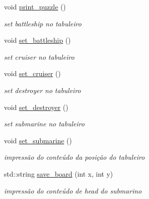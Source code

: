\begin{DoxyCompactItemize}
void \hyperlink{classpuzzle_a842cbb0148e02ce593363dabbdb0d4c5}{print\+\_\+puzzle} ()
\begin{DoxyCompactList}\small\item\em set battleship no tabuleiro \end{DoxyCompactList}\item 
\mbox{\label{classpuzzle_a793a79c16dc7d88b90df080e4b9500b2}} 
void \hyperlink{classpuzzle_a793a79c16dc7d88b90df080e4b9500b2}{set\+\_\+battleship} ()
\begin{DoxyCompactList}\small\item\em set cruiser no tabuleiro \end{DoxyCompactList}\item 
\mbox{\label{classpuzzle_aa409f4aea22a8101733b8a45f278b29a}} 
void \hyperlink{classpuzzle_aa409f4aea22a8101733b8a45f278b29a}{set\+\_\+cruiser} ()
\begin{DoxyCompactList}\small\item\em set destroyer no tabuleiro \end{DoxyCompactList}\item 
\mbox{\label{classpuzzle_aa0ba02dad742cf73b585ef9b1e31c8aa}} 
void \hyperlink{classpuzzle_aa0ba02dad742cf73b585ef9b1e31c8aa}{set\+\_\+destroyer} ()
\begin{DoxyCompactList}\small\item\em set submarine no tabuleiro \end{DoxyCompactList}\item 
\mbox{\label{classpuzzle_aa1455251b7d3d727b69f1d3ccb3e3f53}} 
void \hyperlink{classpuzzle_aa1455251b7d3d727b69f1d3ccb3e3f53}{set\+\_\+submarine} ()
\begin{DoxyCompactList}\small\item\em impressão do conteúdo da posição do tabuleiro \end{DoxyCompactList}\item 
\mbox{\label{classpuzzle_a941eb0ae797ac514aa0d2f8f5d9dd083}} 
std\+::string \hyperlink{classpuzzle_a941eb0ae797ac514aa0d2f8f5d9dd083}{save\+\_\+board} (int x, int y)
\begin{DoxyCompactList}\small\item\em impressão do conteúdo de head do submarino \end{DoxyCompactList}\item 

\end{DoxyCompactItemize}
